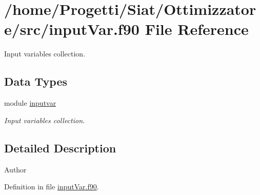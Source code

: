 \hypertarget{input_var_8f90}{\section{/home/\-Progetti/\-Siat/\-Ottimizzatore/src/input\-Var.f90 File Reference}
\label{input_var_8f90}
}


Input variables collection.  


\subsection*{Data Types}
\begin{DoxyCompactItemize}
\item 
module \hyperlink{classinputvar}{inputvar}
\begin{DoxyCompactList}\small\item\em Input variables collection. \end{DoxyCompactList}\end{DoxyCompactItemize}


\subsection{Detailed Description}
\begin{DoxyAuthor}{Author}

\end{DoxyAuthor}


Definition in file \hyperlink{input_var_8f90_source}{input\-Var.\-f90}.

